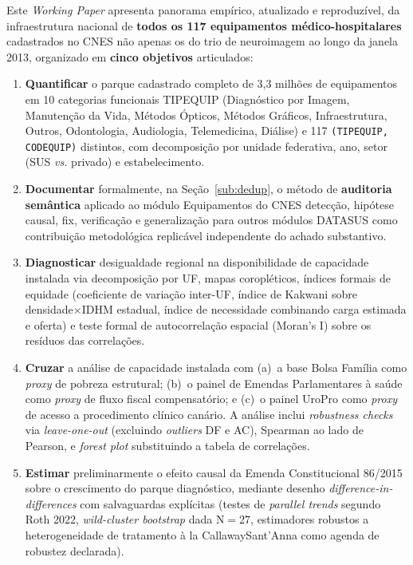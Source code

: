 \documentclass[12pt,a4paper,oneside]{article}
\begin{document}
Este \textit{Working Paper} apresenta panorama empírico, atualizado
e reproduzível, da infraestrutura nacional de \textbf{todos os 117
equipamentos médico-hospitalares} cadastrados no CNES\textemdash{}
não apenas os do trio de neuroimagem \textemdash{} ao longo da
janela 2013, organizado em \textbf{cinco objetivos}
articulados:

\begin{enumerate}
\item \textbf{Quantificar} o parque cadastrado completo de 3,3
milhões de equipamentos em 10 categorias funcionais TIPEQUIP
(Diagnóstico por Imagem, Manutenção da Vida, Métodos Ópticos,
Métodos Gráficos, Infraestrutura, Outros, Odontologia, Audiologia,
Telemedicina, Diálise) e 117 \texttt{(TIPEQUIP, CODEQUIP)}
distintos, com decomposição por unidade federativa, ano, setor (SUS
\textit{vs.} privado) e estabelecimento.
\item \textbf{Documentar} formalmente, na Seção~\ref{sub:dedup}, o
método de \textbf{auditoria semântica} aplicado ao módulo
Equipamentos do CNES \textemdash{} detecção, hipótese causal, fix,
verificação e generalização para outros módulos DATASUS \textemdash{}
como contribuição metodológica replicável independente do achado
substantivo.
\item \textbf{Diagnosticar} desigualdade regional na disponibilidade
de capacidade instalada via decomposição por UF, mapas coropléticos,
índices formais de equidade (coeficiente de variação inter-UF,
índice de Kakwani sobre densidade$\times$IDHM estadual, índice de
necessidade combinando carga estimada e oferta) e teste formal de
autocorrelação espacial (Moran's I) sobre os resíduos das
correlações.
\item \textbf{Cruzar} a análise de capacidade instalada com (a)~a
base Bolsa Família como \textit{proxy} de pobreza estrutural;
(b)~o painel de Emendas Parlamentares à saúde como \textit{proxy} de
fluxo fiscal compensatório; e (c)~o painel UroPro como \textit{proxy}
de acesso a procedimento clínico canário. A análise inclui
\textit{robustness checks} via \textit{leave-one-out} (excluindo
\textit{outliers} DF e AC), Spearman ao lado de Pearson, e \textit{forest
plot} substituindo a tabela de correlações.
\item \textbf{Estimar} preliminarmente o efeito causal da Emenda
Constitucional 86/2015 sobre o crescimento do parque diagnóstico,
mediante desenho \textit{difference-in-differences} com salvaguardas
explícitas (testes de \textit{parallel trends} segundo Roth 2022,
\textit{wild-cluster bootstrap} dada N$=$27, estimadores robustos a
heterogeneidade de tratamento à la Callaway\textendash Sant'Anna como
agenda de robustez declarada).
\end{enumerate}
\end{document}
